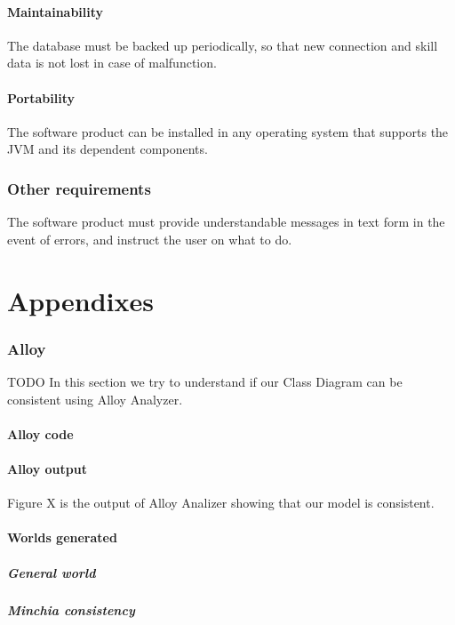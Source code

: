 \documentclass[10pt,a4paper,titlepage]{article}
\begin{document}
\subsection{Maintainability}
The database must be backed up periodically, so that new connection and skill data is not lost
in case of malfunction.

\subsection{Portability}
The software product can be installed in any operating system that supports the JVM and its dependent components.

\section{Other requirements}
The software product must provide understandable messages in text form in the event of
errors, and instruct the user on what to do.

\clearpage
\part{Appendixes}

\section{Alloy}
TODO
In this section we try to understand if our Class Diagram can be consistent using Alloy Analyzer.

\subsection{Alloy code}

\subsection{Alloy output}
Figure X is the output of Alloy Analizer showing that our model is consistent.

\subsection{Worlds generated}
\subsubsection{General world}
\subsubsection{Minchia consistency}
\end{document}
